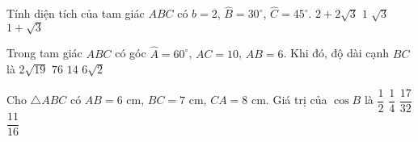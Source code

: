 \begin{ex}
	Tính diện tích của tam giác $ABC$ có $b=2$, $\widehat{B}=30^\circ$, $\widehat{C}=45^\circ$.
	\choice
	{$2+2\sqrt{3}$}
	{$1$}
	{$\sqrt{3}$}
	{\True $1+\sqrt{3}$}
\end{ex}
\begin{ex}
	Trong tam giác $ABC$ có góc $\widehat{A}=60^{\circ}$, $AC=10$, $AB=6$. Khi đó, độ dài cạnh $BC$ là
	\choice
	{\True $2\sqrt{19}$}
	{$76$}
	{$14$}
	{$6\sqrt{2}$}
\end{ex}
\begin{ex}
	Cho $\triangle ABC$ có $AB=6$ cm, $BC=7$ cm, $CA=8$ cm. Giá trị của $\cos B$ là
	\choice
	{$\dfrac{1}{2}$}
	{\True $\dfrac{1}{4}$}
	{$\dfrac{17}{32}$}
	{$\dfrac{11}{16}$}
\end{ex}
